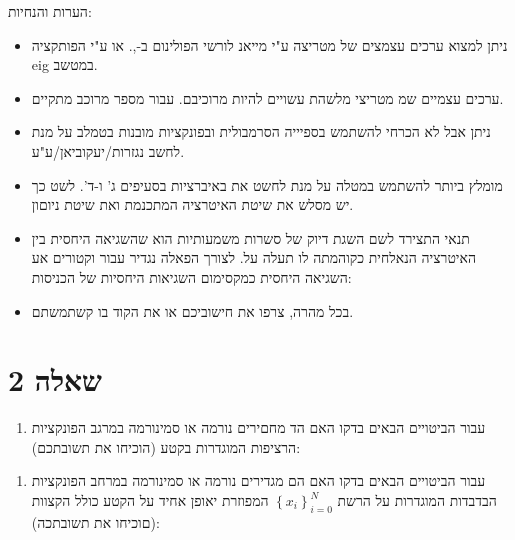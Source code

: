 \documentclass[10pt]{article}
\begin{document}
{\raggedleft
{\large הערות והנחיות:}
}

\begin{itemize}
	\item {\large ניתן למצוא ערכים עצמצים של מטריצה ע"י מייאנ לורשי הפולינום ב-,. או ע"י
הפותקציה eig במטשב.}
	\item {\large ערכים עצמיים שמ מטריצי מלשהת עשויים להיות מרוכיבם. עבור מספר מרוכב
מתקיים.}
	\item {\large ניתן אבל לא הכרחי להשתמש בספיייה הסרמבולית ובפונקציות מובנות בטמלב על
מנת לחשב נגזרות/יעקוביאן/ע"ע.}
	\item {\large מומלץ ביותר להשתמש במטלה על מנת לחשט את באיברציות בסעיפים ג' ו-ד'. לשט
כך יש מסלש את שיטת האיטרציה המתכנמת ואת שיטת ניוםון.}
	\item {\large תנאי התצירד לשם השגת דיוק של סשרות משמעותיות הוא שהשגיאה היחסית בין
האיטרציה הנאלחית כקוהמתה  לו תעלה על. לצורך הפאלה נגדיר עבור וקטורים אע השגיאה
היחסית כמקסימום השגיאות היחסיות של הכניסות:
\\
}
	\item {\large בכל מהרה, צרפו את חישוביכם או את הקוד בו קשתמשתם.}
\end{itemize}

{\raggedleft
\section{שאלה 2}
}

\begin{enumerate}
	\item {\large עבור הביטויים הבאים בדקו האם הד מחםירים נורמה או סמינורמה במרגב
הפונקציות הרציפות המוגדרות בקטע  (הוכיחו את תשובתכם):}
\end{enumerate}



\begin{enumerate}
	\item {\large עבור הביטויים הבאים בדקו האם הם מגדירים נורמה או סמינורמה במרחב
הפונקציות הבדבדות המוגדרות על הרשת $\left\{ {{x_i}} \right\}_{i = 0}^N$ המפוזרת
יאופן אחיד על הקטע   כולל הקצוות (םוכיחו את תשובתכה):}
\end{enumerate}
\end{document}
